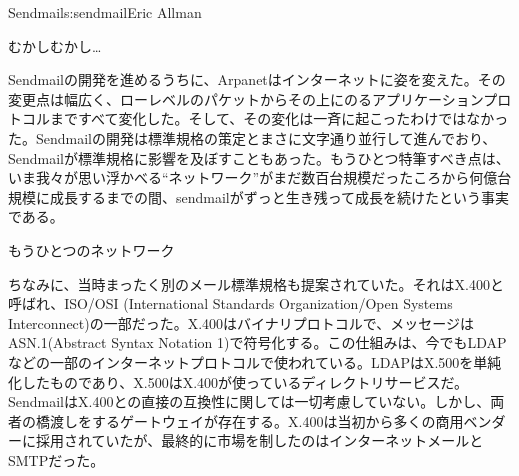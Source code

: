 \begin{aosachapter}{Sendmail}{s:sendmail}{Eric Allman}
\begin{aosasect1}{むかしむかし\ldots}
\pagebreak

Sendmailの開発を進めるうちに、Arpanetはインターネットに姿を変えた。その変更点は幅広く、ローレベルのパケットからその上にのるアプリケーションプロトコルまですべて変化した。そして、その変化は一斉に起こったわけではなかった。Sendmailの開発は標準規格の策定とまさに文字通り並行して進んでおり、Sendmailが標準規格に影響を及ぼすこともあった。もうひとつ特筆すべき点は、いま我々が思い浮かべる``ネットワーク''がまだ数百台規模だったころから何億台規模に成長するまでの間、sendmailがずっと生き残って成長を続けたという事実である。

\begin{aosabox}{もうひとつのネットワーク}

ちなみに、当時まったく別のメール標準規格も提案されていた。それはX.400と呼ばれ、ISO/OSI (International Standards Organization/Open Systems Interconnect)の一部だった。X.400はバイナリプロトコルで、メッセージはASN.1(Abstract Syntax Notation 1)で符号化する。この仕組みは、今でもLDAPなどの一部のインターネットプロトコルで使われている。LDAPはX.500を単純化したものであり、X.500はX.400が使っているディレクトリサービスだ。SendmailはX.400との直接の互換性に関しては一切考慮していない。しかし、両者の橋渡しをするゲートウェイが存在する。X.400は当初から多くの商用ベンダーに採用されていたが、最終的に市場を制したのはインターネットメールとSMTPだった。


\end{aosabox}
\end{aosasect1}
\end{aosachapter}
